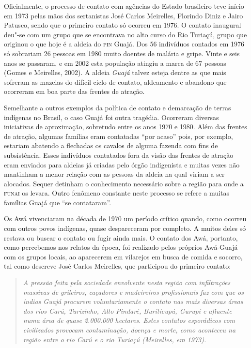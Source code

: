 Oficialmente, o processo de contato com agências do Estado brasileiro
teve início em 1973 pelas mãos dos sertanistas José Carlos Meirelles,
Florindo Diniz e Jairo Patusco, sendo que o primeiro contato só ocorreu
em 1976. O contato inaugural deu"-se com um grupo que se encontrava no
alto curso do Rio Turiaçú, grupo que originou o que hoje é a aldeia do
\textsc{pin} Guajá. Dos 56 indivíduos contados em 1976 só sobrariam 26 pessoas em
1980 muito doentes de malária e gripe. Vinte e seis anos se passaram, e
em 2002 esta população atingiu a marca de 67 pessoas (Gomes e Meirelles,
2002). A aldeia \emph{Guajá} talvez esteja dentre as que mais sofreram
as mazelas do difícil ciclo de contato, aldeamento e abandono que
ocorreram em boa parte das frentes de atração.

Semelhante a outros exemplos da política de contato e demarcação de
terras indígenas no Brasil, o caso Guajá foi outra tragédia. Ocorreram
diversas iniciativas de aproximação, sobretudo entre os anos 1970 e
1980. Além das frentes de atração, algumas famílias eram contatadas
``por acaso'' pois, por exemplo, estariam abatendo a flechadas os
cavalos de alguma fazenda com fins de subsistência. Esses indivíduos
contatados fora da visão das frentes de atração eram enviados para
aldeias já criadas pelo órgão indigenista e muitas vezes não mantinham a
menor relação com as pessoas da aldeia na qual viriam a ser alocados.
Sequer detinham o conhecimento necessário sobre a região para onde a
\textsc{funai} os levara. Outro fenômeno constante neste processo se refere a
muitas famílias Guajá que ``se contataram''.

Os Awá vivenciaram na década de 1970 um período crítico quando, como
ocorreu com outros povos indígenas, quase despareceram por completo. A
muitos deles só restava ou buscar o contato ou fugir ainda mais. O
contato dos Awá, portanto, como percebemos nos relatos da época, foi
realizado pelos próprios Awá-Guajá com os grupos locais, ao aparecerem
em vilarejos em busca de comida e socorro, tal como descreve José Carlos
Meirelles, que participou do primeiro contato:

\begin{quote}
\emph{A pressão feita pela sociedade envolvente nesta região com infiltrações
massivas de grileiros, caçadores e madeireiros profissionais faz com que
os índios Guajá procurem voluntariamente o contato nas mais diversas
áreas dos rios Carú, Turizinho, Alto Pindaré, Buriticupú, Gurupí e
afluente numa área de quase 2.000.000 hectares. Estes contatos
esporádicos com civilizados provocam contaminação, doença e morte, como
aconteceu na região entre o rio Carú e o rio Turiaçú (Meirelles, em
1973).}
\end{quote}

